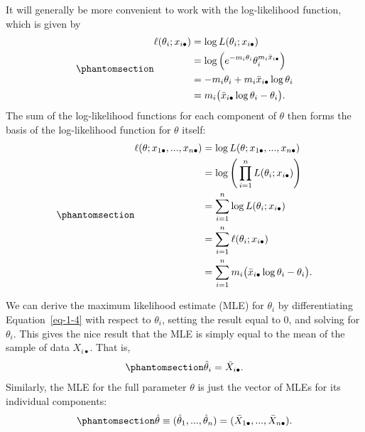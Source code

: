 \documentclass[
  12pt]{article}
\begin{document}
It will generally be more convenient to work with the log-likelihood
function, which is given by
\begin{equation}\phantomsection\label{eq-1-4}{
\begin{aligned}
\ell(\theta_i; x_{i\bullet}) &= \log L(\theta_i; x_{i\bullet}) \\
                           &= \log \Big(e^{-m_i\theta_i}\theta_i^{m_i\bar{x}_{i\bullet}}\Big) \\
                           &= -m_i\theta_i + m_i \bar{x}_{i\bullet} \log \theta_i \\
                           &=  m_i\big(\bar{x}_{i\bullet} \log\theta_i - \theta_i \big).
\end{aligned}
}\end{equation} The sum of the log-likelihood functions for each
component of \(\theta\) then forms the basis of the log-likelihood
function for \(\theta\) itself:
\begin{equation}\phantomsection\label{eq-1-5}{
\begin{aligned}
\ell(\theta; x_{1\bullet}, ..., x_{n\bullet}) &= \log L(\theta; x_{1\bullet}, ..., x_{n\bullet}) \\
                                              &= \log \Bigg(\prod_{i=1}^n L(\theta_i; x_{i\bullet})\Bigg) \\
                                              &= \sum_{i=1}^n \log L(\theta_i; x_{i\bullet}) \\
                                              &= \sum_{i=1}^n \ell(\theta_i; x_{i\bullet}) \\
                                              &= \sum_{i=1}^n m_i\big(\bar{x}_{i\bullet} \log\theta_i - \theta_i \big).
\end{aligned}
}\end{equation}

We can derive the maximum likelihood estimate (MLE) for \(\theta_i\) by
differentiating Equation~\ref{eq-1-4} with respect to \(\theta_i\),
setting the result equal to 0, and solving for \(\theta_i\). This gives
the nice result that the MLE is simply equal to the mean of the sample
of data \(X_{i\bullet}\). That is,
\begin{equation}\phantomsection\label{eq-1-6}{
\hat{\theta}_i = \bar{X}_{i\bullet}.
}\end{equation} Similarly, the MLE for the full parameter \(\theta\) is
just the vector of MLEs for its individual components:
\begin{equation}\phantomsection\label{eq-1-7}{
\hat{\theta} \equiv (\hat{\theta}_1, ..., \hat{\theta}_n) = (\bar{X}_{1\bullet}, ..., \bar{X}_{n\bullet}).
}\end{equation}
\end{document}

